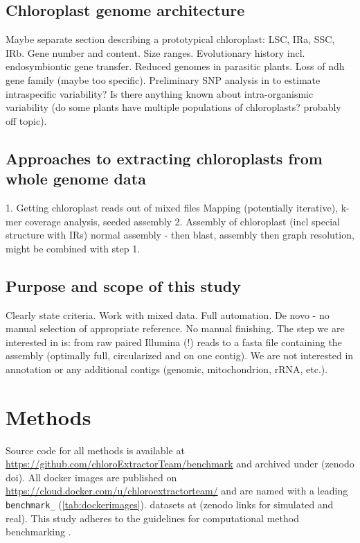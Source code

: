 \documentclass{bmcart}
\begin{document}
\subsection*{Chloroplast genome architecture}
Maybe separate section describing a prototypical chloroplast: LSC, IRa, SSC, IRb. Gene number and content. Size ranges. Evolutionary history incl. endosymbiontic gene transfer. Reduced genomes in parasitic plants. Loss of ndh gene family (maybe too specific). Preliminary SNP analysis in  to estimate intraspecific variability? Is there anything known about intra-organismic variability (do some plants have multiple populations of chloroplasts? probably off topic).

\subsection*{Approaches to extracting chloroplasts from whole genome data}
1. Getting chloroplast reads out of mixed files
Mapping (potentially iterative), k-mer coverage analysis, seeded assembly
2. Assembly of chloroplast (incl special structure with IRs)
normal assembly - then blast, assembly then graph resolution, might be combined with step 1.
\cite{twyford_strategies_2017}

\subsection*{Purpose and scope of this study}
Clearly state criteria. Work with mixed data. Full automation. De novo - no manual selection of appropriate reference. No manual finishing. The step we are interested in is: from raw paired Illumina (!) reads to a fasta file containing the assembly (optimally full, circularized and on one contig). We are not interested in annotation or any additional contigs (genomic, mitochondrion, rRNA, etc.).

\section*{Methods}
Source code for all methods is available at \url{https://github.com/chloroExtractorTeam/benchmark} and archived under (zenodo doi).
All docker images are published on \url{https://cloud.docker.com/u/chloroextractorteam/} and are named with a leading \texttt{benchmark\_} (\cref{tab:dockerimages}).
datasets at (zenodo links for simulated and real).
This study adheres to the guidelines for computational method benchmarking \cite{weber_essential_2018}.
\end{document}
